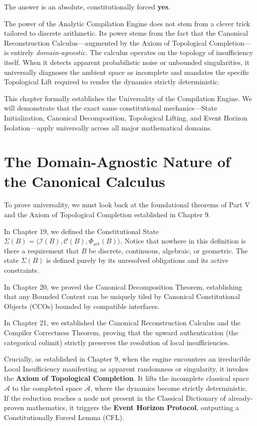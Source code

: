 \documentclass[12pt,openany]{extbook}
\theoremstyle{plain}
\theoremstyle{definition}
\begin{document}
The answer is an absolute, constitutionally forced \textbf{yes}.

The power of the Analytic Compilation Engine does not stem from a clever trick tailored to discrete arithmetic. Its power stems from the fact that the Canonical Reconstruction Calculus---augmented by the Axiom of Topological Completion---is entirely \emph{domain-agnostic}. The calculus operates on the topology of insufficiency itself. When it detects apparent probabilistic noise or unbounded singularities, it universally diagnoses the ambient space as incomplete and mandates the specific Topological Lift required to render the dynamics strictly deterministic.

This chapter formally establishes the Universality of the Compilation Engine. We will demonstrate that the exact same constitutional mechanics---State Initialization, Canonical Decomposition, Topological Lifting, and Event Horizon Isolation---apply universally across all major mathematical domains.

\section{The Domain-Agnostic Nature of the Canonical Calculus}

To prove universality, we must look back at the foundational theorems of Part V and the Axiom of Topological Completion established in Chapter 9.

In Chapter 19, we defined the Constitutional State $\Sigma(B) = \langle \mathcal{I}(B), \mathcal{C}(B), \Phi_{\mathrm{act}}(B) \rangle$. Notice that nowhere in this definition is there a requirement that $B$ be discrete, continuous, algebraic, or geometric. The state $\Sigma(B)$ is defined purely by its unresolved obligations and its active constraints.

In Chapter 20, we proved the Canonical Decomposition Theorem, establishing that any Bounded Context can be uniquely tiled by Canonical Constitutional Objects (CCOs) bounded by compatible interfaces.

In Chapter 21, we established the Canonical Reconstruction Calculus and the Compiler Correctness Theorem, proving that the upward authentication (the categorical colimit) strictly preserves the resolution of local insufficiencies.

Crucially, as established in Chapter 9, when the engine encounters an irreducible Local Insufficiency manifesting as apparent randomness or singularity, it invokes the \textbf{Axiom of Topological Completion}. It lifts the incomplete classical space $\mathcal{A}$ to the completed space $\overline{\mathcal{A}}$, where the dynamics become strictly deterministic. If the reduction reaches a node not present in the Classical Dictionary of already-proven mathematics, it triggers the \textbf{Event Horizon Protocol}, outputting a Constitutionally Forced Lemma (CFL).
\end{document}
